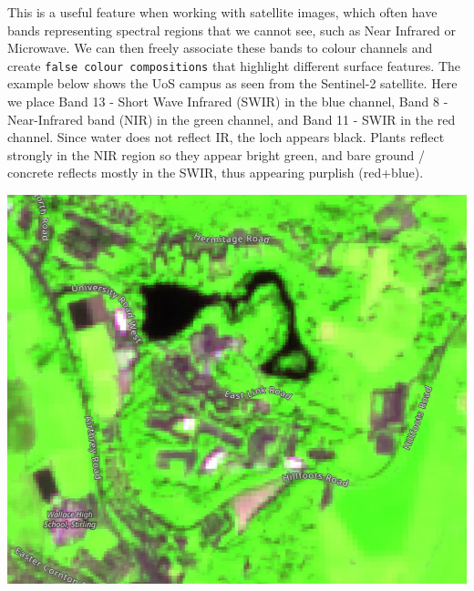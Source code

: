 \documentclass[
  letterpaper,
  DIV=11,
  numbers=noendperiod]{scrreprt}
\begin{document}
\begin{tcolorbox}[enhanced jigsaw, coltitle=black, toprule=.15mm, breakable, opacitybacktitle=0.6, left=2mm, colback=white, leftrule=.75mm, rightrule=.15mm, colbacktitle=quarto-callout-tip-color!10!white, toptitle=1mm, titlerule=0mm, colframe=quarto-callout-tip-color-frame, arc=.35mm, bottomtitle=1mm, opacityback=0, bottomrule=.15mm, title=\textcolor{quarto-callout-tip-color}{\faLightbulb}\hspace{0.5em}{Tip}]

This is a useful feature when working with satellite images, which often
have bands representing spectral regions that we cannot see, such as
Near Infrared or Microwave. We can then freely associate these bands to
colour channels and create \texttt{false\ colour\ compositions} that
highlight different surface features. The example below shows the UoS
campus as seen from the Sentinel-2 satellite. Here we place Band 13 -
Short Wave Infrared (SWIR) in the blue channel, Band 8 - Near-Infrared
band (NIR) in the green channel, and Band 11 - SWIR in the red channel.
Since water does not reflect IR, the loch appears black. Plants reflect
strongly in the NIR region so they appear bright green, and bare ground
/ concrete reflects mostly in the SWIR, thus appearing purplish
(red+blue).

\includegraphics{images/lab_6/lab_6_fig10_StirSentinel.jpg}

\end{tcolorbox}
\end{document}
